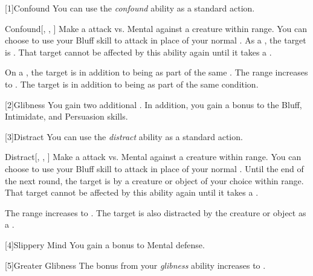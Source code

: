        [1]{Confound} You can use the \textit{confound} ability as a standard action.
        \begin{freeability}{Confound}[, , ]
            Make a attack vs. Mental against a creature within \rngclose range.
            You can choose to use your Bluff skill to attack in place of your normal .
            \hit As a , the target is .
            That target cannot be affected by this ability again until it takes a .

            \rankline
             On a , the target is  in addition to being  as part of the same .
             The range increases to \rngmed.
             The target is  in addition to being  as part of the same condition.
        \end{freeability}

        [2]{Glibness} You gain two additional .
        In addition, you gain a  bonus to the Bluff, Intimidate, and Persuasion skills.

        [3]{Distract} You can use the \textit{distract} ability as a standard action.
        \begin{freeability}{Distract}[, , ]
            Make a attack vs. Mental against a creature within \rngclose range.
            You can choose to use your Bluff skill to attack in place of your normal .
            \hit Until the end of the next round, the target is  by a creature or object of your choice within range.
            That target cannot be affected by this ability again until it takes a .

            \rankline
             The range increases to \rngmed.
             The target is also distracted by the creature or object as a .
        \end{freeability}

        [4]{Slippery Mind} You gain a  bonus to Mental defense.

        [5]{Greater Glibness} The bonus from your \textit{glibness} ability increases to .


